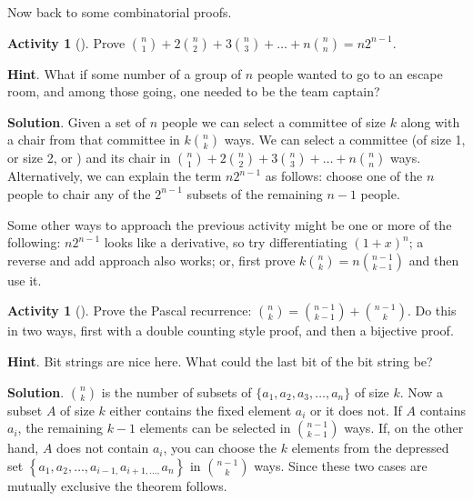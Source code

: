 \documentclass[10pt,]{book}
\theoremstyle{plain}
\theoremstyle{definition}
\theoremstyle{definition}
\theoremstyle{definition}
\newtheorem{activity}[project]{Activity}
\numberwithin{equation}{chapter}
\begin{document}
\hypertarget{p-695}{}%
Now back to some combinatorial proofs.%
\begin{activity}[]\label{act_anysizecommittee}
\hypertarget{p-696}{}%
Prove \(\binom{n}{1} + 2 \binom{n}{2} + 3 \binom{n}{3} + \ldots + n \binom{n}{n} = n2^{n - 1}\).%
\par\smallskip%
\noindent\textbf{Hint}.\hypertarget{hint-52}{}\quad%
\hypertarget{p-697}{}%
What if some number of a group of \(n\) people wanted to go to an escape room, and among those going, one needed to be the team captain?%
\par\smallskip%
\noindent\textbf{Solution}.\hypertarget{solution-46}{}\quad%
\hypertarget{p-698}{}%
Given a set of \(n\) people we can select a committee of size \(k\) along with a chair from that committee in \(k \binom{n}{k}\) ways. We can select a committee (of size 1, or size 2, or \textellipsis{}) and its chair in \(\binom{n}{1} + 2 \binom{n}{2} + 3 \binom{n}{3} + \ldots + n \binom{n}{n}\) ways. Alternatively, we can explain the term \(n2^{n - 1}\) as follows: choose one of the \(n\) people to chair any of the \(2^{n - 1}\) subsets of the remaining \(n - 1\) people.%
\end{activity}
\hypertarget{p-699}{}%
Some other ways to approach the previous activity might be one or more of the following: \(n2^{n - 1}\) looks like a derivative, so try differentiating \(\left( 1 + x \right)^{n}\); a reverse and add approach also works; or, first prove \(k \binom{n}{k} = n \binom{n - 1}{k - 1}\) and then use it.%
\begin{activity}[]\label{activity-92}
\hypertarget{p-700}{}%
Prove the Pascal recurrence: \(\binom{n}{k} = \binom{n - 1}{k-1} + \binom{n - 1}{k}\).  Do this in two ways, first with a double counting style proof, and then a bijective proof.%
\par\smallskip%
\noindent\textbf{Hint}.\hypertarget{hint-53}{}\quad%
\hypertarget{p-701}{}%
Bit strings are nice here.  What could the last bit of the bit string be?%
\par\smallskip%
\noindent\textbf{Solution}.\hypertarget{solution-47}{}\quad%
\hypertarget{p-702}{}%
 \(\binom{n}{k}\) is the number of subsets of \(\{ a_{1},a_{2},a_{3},\ldots,a_{n}\}\) of size \(k\). Now a subset \(A\) of size \(k\) either contains the fixed element \(a_{i}\) or it does not. If \(A\) contains \(a_{i}\), the remaining \(k - 1\) elements can be selected in \(\binom{n - 1}{k - 1}\) ways. If, on the other hand, \(A\) does not contain \(a_{i}\), you can choose the \(k\) elements from the depressed set \(\left\{ a_{1},a_{2},\ldots,a_{i - 1,}a_{i + 1,\ldots,}a_{n} \right\}\) in \(\binom{n - 1}{k}\) ways. Since these two cases are mutually exclusive the theorem follows.%
\end{activity}
\end{document}
